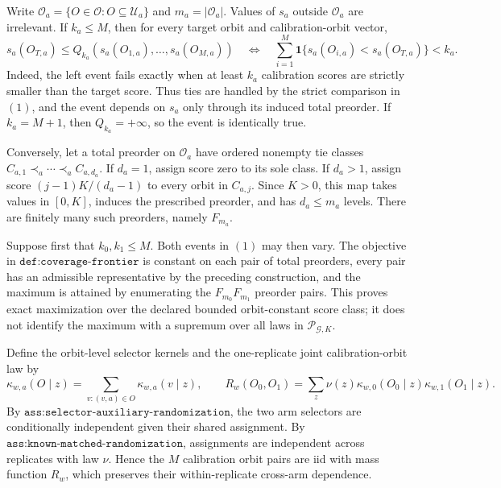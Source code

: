 Write \(\mathcal O_a=\{O\in\mathcal O:O\subseteq\mathcal U_a\}\) and \(m_a=|\mathcal O_a|\). Values of \(s_a\) outside \(\mathcal O_a\) are irrelevant. If \(k_a\le M\), then for every target orbit and calibration-orbit vector,
\[
s_a(O_{T,a})\le Q_{k_a}(s_a(O_{1,a}),\ldots,s_a(O_{M,a}))
\quad\Longleftrightarrow\quad
\sum_{i=1}^M\mathbf 1\{s_a(O_{i,a})<s_a(O_{T,a})\}<k_a.
\tag{1}
\]
Indeed, the left event fails exactly when at least \(k_a\) calibration scores are strictly smaller than the target score. Thus ties are handled by the strict comparison in \((1)\), and the event depends on \(s_a\) only through its induced total preorder. If \(k_a=M+1\), then \(Q_{k_a}=+\infty\), so the event is identically true.

Conversely, let a total preorder on \(\mathcal O_a\) have ordered nonempty tie classes \(C_{a,1}\prec_a\cdots\prec_a C_{a,d_a}\). If \(d_a=1\), assign score zero to its sole class. If \(d_a>1\), assign score \((j-1)K/(d_a-1)\) to every orbit in \(C_{a,j}\). Since \(K>0\), this map takes values in \([0,K]\), induces the prescribed preorder, and has \(d_a\le m_a\) levels. There are finitely many such preorders, namely \(F_{m_a}\).

Suppose first that \(k_0,k_1\le M\). Both events in \((1)\) may then vary. The objective in \(\texttt{def:coverage-frontier}\) is constant on each pair of total preorders, every pair has an admissible representative by the preceding construction, and the maximum is attained by enumerating the \(F_{m_0}F_{m_1}\) preorder pairs. This proves exact maximization over the declared bounded orbit-constant score class; it does not identify the maximum with a supremum over all laws in \(\mathcal P_{\mathcal G,K}\).

Define the orbit-level selector kernels and the one-replicate joint calibration-orbit law by
\[
\kappa_{w,a}(O\mid z)=\sum_{v:(v,a)\in O}\kappa_{w,a}(v\mid z),
\qquad
R_w(O_0,O_1)=\sum_z\nu(z)\kappa_{w,0}(O_0\mid z)\kappa_{w,1}(O_1\mid z).
\tag{2}
\]
By \(\texttt{ass:selector-auxiliary-randomization}\), the two arm selectors are conditionally independent given their shared assignment. By \(\texttt{ass:known-matched-randomization}\), assignments are independent across replicates with law \(\nu\). Hence the \(M\) calibration orbit pairs are iid with mass function \(R_w\), which preserves their within-replicate cross-arm dependence.

